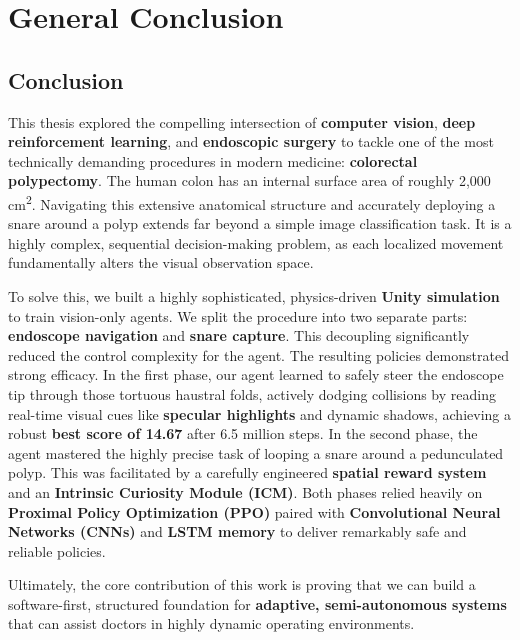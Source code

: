 \chapter{General Conclusion}
\label{chap:general_conclusion}

\section*{Conclusion}
\begin{flushleft}
This thesis explored the compelling intersection of \textbf{computer vision}, \textbf{deep reinforcement learning}, and \textbf{endoscopic surgery} to tackle one of the most technically demanding procedures in modern medicine: \textbf{colorectal polypectomy}. The human colon has an internal surface area of roughly 2,000\,cm\textsuperscript{2}. Navigating this extensive anatomical structure and accurately deploying a snare around a polyp extends far beyond a simple image classification task. It is a highly complex, sequential decision-making problem, as each localized movement fundamentally alters the visual observation space.

To solve this, we built a highly sophisticated, physics-driven \textbf{Unity simulation} to train vision-only agents. We split the procedure into two separate parts: \textbf{endoscope navigation} and \textbf{snare capture}. This decoupling significantly reduced the control complexity for the agent. The resulting policies demonstrated strong efficacy. In the first phase, our agent learned to safely steer the endoscope tip through those tortuous haustral folds, actively dodging collisions by reading real-time visual cues like \textbf{specular highlights} and dynamic shadows, achieving a robust \textbf{best score of 14.67} after 6.5 million steps. In the second phase, the agent mastered the highly precise task of looping a snare around a pedunculated polyp. This was facilitated by a carefully engineered \textbf{spatial reward system} and an \textbf{Intrinsic Curiosity Module (ICM)}. Both phases relied heavily on \textbf{Proximal Policy Optimization (PPO)} paired with \textbf{Convolutional Neural Networks (CNNs)} and \textbf{LSTM memory} to deliver remarkably safe and reliable policies.

Ultimately, the core contribution of this work is proving that we can build a software-first, structured foundation for \textbf{adaptive, semi-autonomous systems} that can assist doctors in highly dynamic operating environments. 
\end{flushleft}

